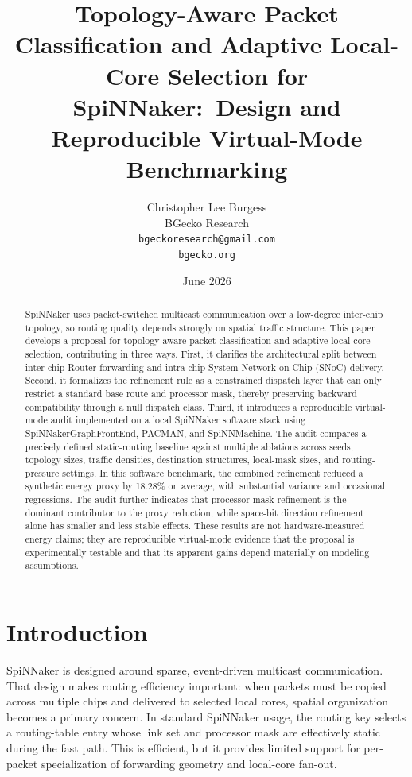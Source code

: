 \documentclass[11pt]{article}
\title{Topology-Aware Packet Classification and Adaptive Local-Core Selection for SpiNNaker:\
Design and Reproducible Virtual-Mode Benchmarking}
\author{Christopher Lee Burgess\\BGecko Research\\\texttt{bgeckoresearch@gmail.com}\\\texttt{bgecko.org}}
\date{June 2026}
\begin{document}
\maketitle

\begin{abstract}
SpiNNaker uses packet-switched multicast communication over a low-degree inter-chip topology, so routing quality depends strongly on spatial traffic structure. This paper develops a proposal for topology-aware packet classification and adaptive local-core selection, contributing in three ways. First, it clarifies the architectural split between inter-chip Router forwarding and intra-chip System Network-on-Chip (SNoC) delivery. Second, it formalizes the refinement rule as a constrained dispatch layer that can only restrict a standard base route and processor mask, thereby preserving backward compatibility through a null dispatch class. Third, it introduces a reproducible virtual-mode audit implemented on a local SpiNNaker software stack using SpiNNakerGraphFrontEnd, PACMAN, and SpiNNMachine. The audit compares a precisely defined static-routing baseline against multiple ablations across seeds, topology sizes, traffic densities, destination structures, local-mask sizes, and routing-pressure settings. In this software benchmark, the combined refinement reduced a synthetic energy proxy by 18.28\% on average, with substantial variance and occasional regressions. The audit further indicates that processor-mask refinement is the dominant contributor to the proxy reduction, while space-bit direction refinement alone has smaller and less stable effects. These results are not hardware-measured energy claims; they are reproducible virtual-mode evidence that the proposal is experimentally testable and that its apparent gains depend materially on modeling assumptions.
\end{abstract}

\section{Introduction}
SpiNNaker is designed around sparse, event-driven multicast communication. That design makes routing efficiency important: when packets must be copied across multiple chips and delivered to selected local cores, spatial organization becomes a primary concern. In standard SpiNNaker usage, the routing key selects a routing-table entry whose link set and processor mask are effectively static during the fast path. This is efficient, but it provides limited support for per-packet specialization of forwarding geometry and local-core fan-out.
\end{document}

